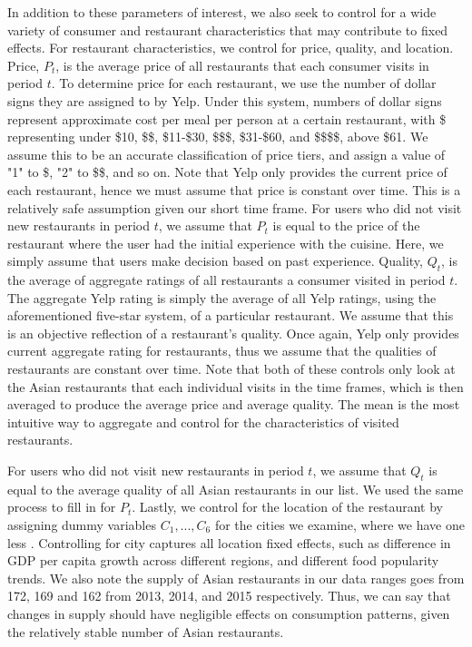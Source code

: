 \documentclass[Journal,letterpaper, NoLineNumbers]{ascelike-new}
\begin{document}
In addition to these parameters of interest, we also seek to control for a wide variety of consumer and restaurant characteristics that may contribute to fixed effects. For restaurant characteristics, we control for price, quality, and location. Price, $P_t$, is the average price of all restaurants that each consumer visits in period $t$. To determine price for each restaurant, we use the number of dollar signs they are assigned to by Yelp. Under this system, numbers of dollar signs represent approximate cost per meal per person at a certain restaurant, with \$ representing under \$10, \$\$, \$11-\$30, \$\$\$, \$31-\$60, and \$\$\$\$, above \$61. We assume this to be an accurate classification of price tiers, and assign a value of "1" to \$, "2" to \$\$, and so on. Note that Yelp only provides the current price of each restaurant, hence we must assume that price is constant over time. This is a relatively safe assumption given our short time frame. For users who did not visit new restaurants in period $t$, we assume that $P_t$ is equal to the price of the restaurant where the user had the initial experience with the cuisine. Here, we simply assume that users make decision based on past experience. Quality, $Q_t$, is the average of aggregate ratings of all restaurants a consumer visited in period $t$. The aggregate Yelp rating is simply the average of all Yelp  ratings, using the aforementioned five-star system, of a particular restaurant. We assume that this is an objective reflection of a restaurant's quality. Once again, Yelp only provides current aggregate rating for restaurants, thus we assume that the qualities of restaurants are constant over time. Note that both of these controls only look at the Asian restaurants that each individual visits in the time frames, which is then averaged to produce the average price and average quality. The mean  is the most intuitive way to aggregate and control for the characteristics of visited restaurants. 

For users who did not visit new restaurants in period $t$, we assume that $Q_t$ is equal to the average quality of all Asian restaurants in our list. We used the same process to fill in for $P_t$. Lastly, we control for the location of the restaurant by assigning dummy variables $C_1, ..., C_6$ for the cities we examine, where we have one less . Controlling for city captures all location fixed effects, such as difference in GDP per capita growth across different regions, and different food popularity trends. We also note the supply of Asian restaurants in our data ranges goes from 172, 169 and 162 from 2013, 2014, and 2015 respectively. Thus, we can say that changes in supply should have negligible effects on consumption patterns, given the relatively stable number of Asian restaurants. 
	
\end{document}
